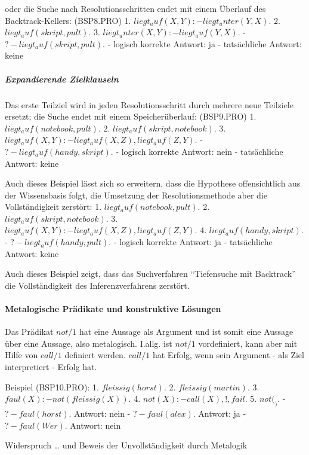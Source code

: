 \documentclass[a4paper]{article}
\begin{document}
\begin{multicols}{3}
  oder die Suche nach Resolutionsschritten endet mit einem Überlauf des
  Backtrack-Kellers: (BSP8.PRO) 1. $liegt_auf(X,Y) :- liegt_unter(Y,X).$
  2. $liegt_auf( skript , pult ).$ 3.
  $liegt_unter(X,Y) :- liegt_auf(Y,X).$ - $?- liegt_auf( skript , pult ).$
  - logisch korrekte Antwort: ja - tatsächliche Antwort: keine

  \subparagraph{Expandierende
    Zielklauseln}\label{expandierende-zielklauseln}

  Das erste Teilziel wird in jeden Resolutionsschritt durch mehrere neue
  Teilziele ersetzt; die Suche endet mit einem Speicherüberlauf:
  (BSP9.PRO) 1. $liegt_auf( notebook , pult ).$ 2.
  $liegt_auf( skript , notebook ).$ 3.
  $liegt_auf(X,Y) :- liegt_auf(X,Z), liegt_auf(Z,Y).$ -
  $?- liegt_auf( handy , skript ).$ - logisch korrekte Antwort: nein -
  tatsächliche Antwort: keine

  Auch dieses Beispiel lässt sich so erweitern, dass die Hypothese
  offensichtlich aus der Wissensbasis folgt, die Umsetzung der
  Resolutionsmethode aber die Vollständigkeit zerstört: 1.
  $liegt_auf( notebook , pult ).$ 2. $liegt_auf( skript , notebook ).$ 3.
  $liegt_auf(X,Y) :- liegt_auf(X,Z), liegt_auf(Z,Y).$ 4.
  $liegt_auf( handy , skript ).$ - $?- liegt_auf( handy , pult ).$ -
  logisch korrekte Antwort: ja - tatsächliche Antwort: keine

  Auch dieses Beispiel zeigt, dass das Suchverfahren ``Tiefensuche mit
  Backtrack'' die Vollständigkeit des Inferenzverfahrens zerstört.

  \paragraph{Metalogische Prädikate und konstruktive
    Lösungen}\label{metalogische-pruxe4dikate-und-konstruktive-luxf6sungen}

  Das Prädikat $not/1$ hat eine Aussage als Argument und ist somit eine
  Aussage über eine Aussage, also metalogisch. I.allg. ist $not/1$
  vordefiniert, kann aber mit Hilfe von $call/1$ definiert werden.
  $call/1$ hat Erfolg, wenn sein Argument - als Ziel interpretiert -
  Erfolg hat.

  Beispiel (BSP10.PRO): 1. $fleissig(horst).$ 2. $fleissig(martin).$ 3.
  $faul(X) :- not( fleissig(X) ).$ 4. $not(X) :- call(X), !, fail.$ 5.
  $not( _ ).$ - $?- faul(horst).$ Antwort: nein - $?- faul(alex).$
  Antwort: ja - $?- faul(Wer).$ Antwort: nein

  Widerspruch \ldots{} und Beweis der Unvollständigkeit durch Metalogik


\end{multicols}
\end{document}
